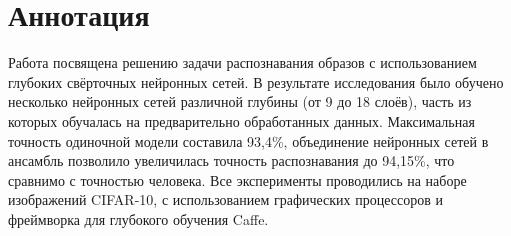 \section*{Аннотация}
Работа посвящена решению задачи распознавания образов с использованием глубоких свёрточных 
нейронных сетей. В результате исследования было обучено несколько нейронных сетей различной глубины 
(от 9 до 18 слоёв), часть из которых обучалась на предварительно обработанных данных. Максимальная 
точность одиночной модели составила 93,4\%, объединение нейронных сетей в ансамбль позволило
увеличилась точность распознавания до 94,15\%, что сравнимо с точностью человека. Все эксперименты 
проводились на наборе изображений CIFAR-10, с использованием графических процессоров и фреймворка
для глубокого обучения Caffe.